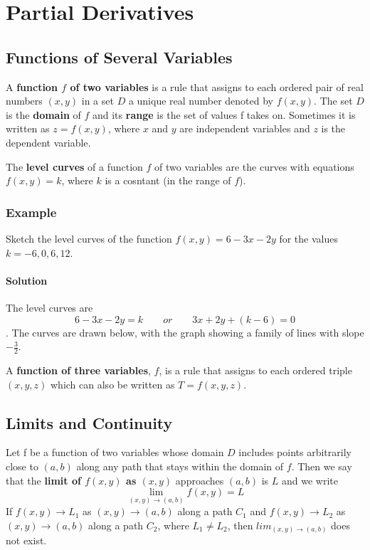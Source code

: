 \setcounter{chapter}{14}
\chapter{Partial Derivatives}

\section{Functions of Several Variables}
A \textbf{function $f$ of two variables} is a rule that assigns to each ordered pair of real numbers $(x,y)$ in a set $D$ a unique real number denoted by $f(x,y)$. The set $D$ is the \textbf{domain} of $f$ and its \textbf{range} is the set of values f takes on. 
Sometimes it is written as $z = f(x,y)$, where $x$ and $y$ are independent variables and $z$ is the dependent variable.

The \textbf{level curves} of a function $f$ of two variables are the curves with equations $f(x,y) = k$, where $k$ is a cosntant (in the range of $f$).

\subsection*{Example}
Sketch the level curves of the function $f(x,y) = 6 - 3x - 2y$ for the values $k = -6, 0, 6, 12$.
\subsubsection*{Solution}
The level curves are $$6-3x-2y = k\qquad or\qquad 3x + 2y + (k-6) = 0$$. The curves are drawn below, with the graph showing a family of lines with slope $-\frac{3}{2}$.

A \textbf{function of three variables}, $f$, is a rule that assigns to each ordered triple $(x,y,z)$ which can also be written as $T = f(x,y,z)$.

\section{Limits and Continuity}
Let f be a function of two variables whose domain $D$ includes points arbitrarily close to $(a,b)$ along any path that stays within the domain of $f$. 
Then we say that the \textbf{limit of $f(x,y)$ as $(x,y)$} approaches $(a,b)$ is $L$ and we write
$$\lim_{(x,y)\rightarrow (a,b)}f(x,y) = L$$
If $f(x,y)\rightarrow L_1$ as $(x,y)\rightarrow (a,b)$ along a path $C_1$ and $f(x,y)\rightarrow L_2$ as $(x,y)\rightarrow (a,b)$ along a path $C_2$, where $L_1\neq L_2$, then $lim_{(x,y)\rightarrow (a,b)}$ does not exist.

